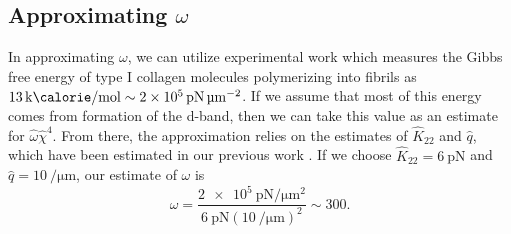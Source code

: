 \documentclass[12pt]{article}
\begin{document}
\subsection{Approximating $\omega$}
In approximating $\omega$, we can utilize experimental work \cite{Laurentspaper} which measures the Gibbs free energy of type I collagen molecules polymerizing into fibrils as $\SI{13}{\kilo\calorie\per\mole}\sim\SI{2e5}{\pico\newton\per\micro\meter\squared}$. If we assume that most of this energy comes from formation of the d-band, then we can take this value as an estimate for $\hat{\omega}\hat{\chi}^4$. From there, the approximation relies on the estimates of $\hat{K}_{22}$ and $\hat{q}$, which have been estimated in our previous work \cite{ourpaper}. If we choose $\hat{K}_{22}=\SI{6}{\pico\newton}$ and $\hat{q}=\SI{10}{\per\micro\meter}$, our estimate of $\omega$ is
\begin{equation}\label{eq:omega}
\omega=\frac{\SI{2e5}{\pico\newton\per\micro\meter\squared}}{\SI{6}{\pico\newton}\left(\SI{10}{\per\micro\meter}\right)^2}\sim300.
\end{equation}
\end{document}
